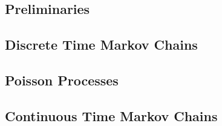 \documentclass{article}
\begin{document}
  \begin{multicols}{2}
    \noindent\subsection*{Preliminaries}
    
    
    
    \subsection*{Discrete Time Markov Chains}
    
    
    
    
    
    
    
    
    
    
    
    \subsection*{Poisson Processes}
    
    
    
    
    
    
    \subsection*{Continuous Time Markov Chains}
    
    
    
    
    
    
    
    
  \end{multicols}
\end{document}

